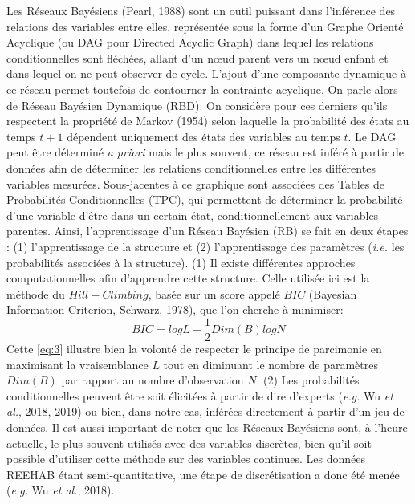 \documentclass[12pt]{report}
\begin{document}
Les Réseaux Bayésiens (Pearl, 1988) sont un outil puissant dans l’inférence des relations des variables entre elles, représentée sous la forme d’un Graphe Orienté Acyclique (ou DAG pour Directed Acyclic Graph) dans lequel les relations conditionnelles sont fléchées, allant d’un nœud parent vers un nœud enfant et dans lequel on ne peut observer de cycle. L’ajout d’une composante dynamique à ce réseau permet toutefois de contourner la contrainte acyclique. On parle alors de Réseau Bayésien Dynamique (RBD). On considère pour ces derniers qu'ils respectent la propriété de Markov (1954) selon laquelle la probabilité des états au temps $t+1$ dépendent uniquement des états des variables au temps $t$.
\newline\newline
Le DAG peut être déterminé \textit{a priori} mais le plus souvent, ce réseau est inféré à partir de données afin de déterminer les relations conditionnelles entre les différentes variables mesurées. Sous-jacentes à ce graphique sont associées des Tables de Probabilités Conditionnelles (TPC), qui permettent de déterminer la probabilité d’une variable d’être dans un certain état, conditionnellement aux variables parentes. Ainsi, l’apprentissage d’un Réseau Bayésien (RB) se fait en deux étapes : (1) l’apprentissage de la structure et (2) l’apprentissage des paramètres (\textit{i.e.} les probabilités associées à la structure). (1) Il existe différentes approches computationnelles afin d'apprendre cette structure. Celle utilisée ici est la méthode du $Hill-Climbing$, basée sur un score appelé $BIC$ (Bayesian Information Criterion, Schwarz, 1978), que l’on cherche à minimiser:
\begin{equation}
    BIC = log L - \frac{1}{2}Dim(B)log N
    \label{eq:3}
\end{equation}
Cette \autoref{eq:3} illustre bien la volonté de respecter le principe de parcimonie en maximisant la vraisemblance $L$ tout en diminuant le nombre de paramètres $Dim(B)$ par rapport au nombre d'observation $N$. (2) Les probabilités conditionnelles peuvent être soit élicitées à partir de dire d’experts (\textit{e.g.} Wu \textit{et al.}, 2018, 2019) ou bien, dans notre cas, inférées directement à partir d’un jeu de données. Il est aussi important de noter que les Réseaux Bayésiens sont, à l’heure actuelle, le plus souvent utilisés avec des variables discrètes, bien qu’il soit possible d’utiliser cette méthode sur des variables continues. Les données REEHAB étant semi-quantitative, une étape de discrétisation a donc été menée (\textit{e.g.} Wu \textit{et al.}, 2018).
\end{document}
